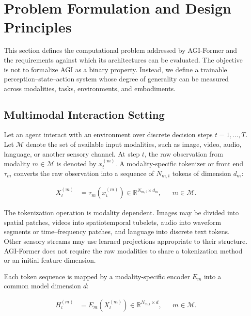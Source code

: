 \section{\textbf{Problem Formulation and Design Principles}}

This section defines the computational problem addressed by AGI-Former and the requirements against which its architectures can be evaluated. The objective is not to formalize AGI as a binary property. Instead, we define a trainable perception--state--action system whose degree of generality can be measured across modalities, tasks, environments, and embodiments.

\subsection{\textbf{Multimodal Interaction Setting}}

Let an agent interact with an environment over discrete decision steps $t=1,\ldots,T$. Let $\mathcal{M}$ denote the set of available input modalities, such as image, video, audio, language, or another sensory channel. At step $t$, the raw observation from modality $m\in\mathcal{M}$ is denoted by $x_t^{(m)}$. A modality-specific tokenizer or front end $\tau_m$ converts the raw observation into a sequence of $N_{m,t}$ tokens of dimension $d_m$:

\begin{equation}
\begin{aligned}
    X_t^{(m)}
    &= \tau_m\!\left(x_t^{(m)}\right)
     \in \mathbb{R}^{N_{m,t}\times d_m},
    && m\in\mathcal{M}.
\end{aligned}
\label{eq:modality_tokenization}
\end{equation}

The tokenization operation is modality dependent. Images may be divided into spatial patches, videos into spatiotemporal tubelets, audio into waveform segments or time--frequency patches, and language into discrete text tokens. Other sensory streams may use learned projections appropriate to their structure. AGI-Former does not require the raw modalities to share a tokenization method or an initial feature dimension.

Each token sequence is mapped by a modality-specific encoder $E_m$ into a common model dimension $d$:

\begin{equation}
\begin{aligned}
    H_t^{(m)}
    &= E_m\!\left(X_t^{(m)}\right)
     \in \mathbb{R}^{N_{m,t}\times d},
    && m\in\mathcal{M}.
\end{aligned}
\label{eq:modality_encoding}
\end{equation}

